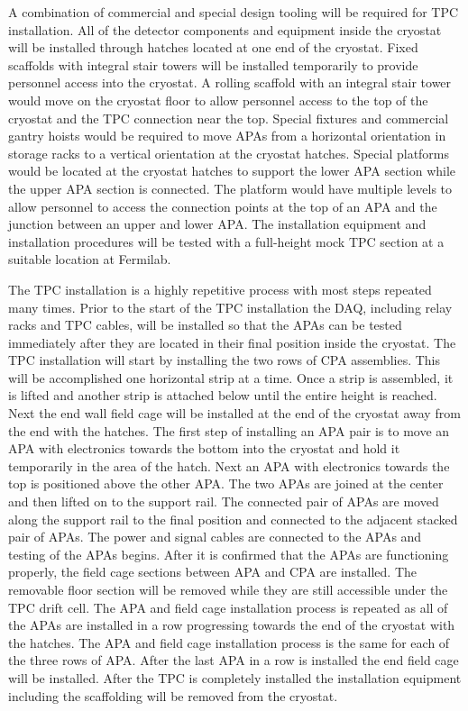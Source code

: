 A combination of commercial and special design tooling will be required for TPC installation. All of the 
detector components and equipment inside the cryostat will be installed through hatches located at one 
end of the cryostat.  Fixed scaffolds with integral stair towers will be installed temporarily to provide 
personnel access into the cryostat. A rolling scaffold with an integral stair tower would move on the 
cryostat floor to allow personnel access to the top of the cryostat and the TPC connection near the top. 
Special fixtures and commercial gantry hoists would be required to move APAs  from a horizontal 
orientation in storage racks to a vertical orientation at the cryostat hatches. Special platforms would be 
located at the cryostat hatches to support the lower APA section while the upper APA section is 
connected. The platform would have multiple levels to allow personnel to access the connection points 
at the top of an APA and the junction between an upper and lower APA. The installation equipment and 
installation procedures will be tested with a full-height mock TPC section at a suitable location at 
Fermilab. 

The TPC installation is a highly repetitive process with most steps repeated many times. Prior to the start 
of the TPC installation the DAQ, including relay racks and TPC cables, will be installed so that the APAs 
can be tested immediately after they are located in their final position inside the cryostat. The TPC 
installation will start by installing the two rows of CPA assemblies. This will be accomplished one 
horizontal strip at a time. Once a strip is assembled, it is lifted and another strip is attached below until 
the entire height is reached. Next the end wall field cage will be installed at the end of the cryostat away 
from the end with the hatches. The first step of installing an APA pair is to move an APA with electronics 
towards the bottom into the cryostat and hold it temporarily in the area of the hatch. Next an APA with 
electronics towards the top is positioned above the other APA. The two APAs are joined at the center and 
then lifted on to the support rail. The connected pair of APAs are moved along the support rail to the 
final position and connected to the adjacent stacked pair of APAs.  The power and signal cables are connected 
to the APAs and testing of the APAs begins. After it is confirmed that the APAs are functioning properly, 
the field cage sections between APA and CPA are installed. The removable floor section will be removed 
while they are still accessible under the TPC drift cell.  The APA and field cage installation process is 
repeated as all of the APAs are installed in a row progressing towards the end of the cryostat with the 
hatches. The APA and field cage installation process is the same for each of the three rows of APA. After 
the last APA in a row is installed the end field cage will be installed. After the TPC is completely installed 
the installation equipment including the scaffolding will be removed from the cryostat.

